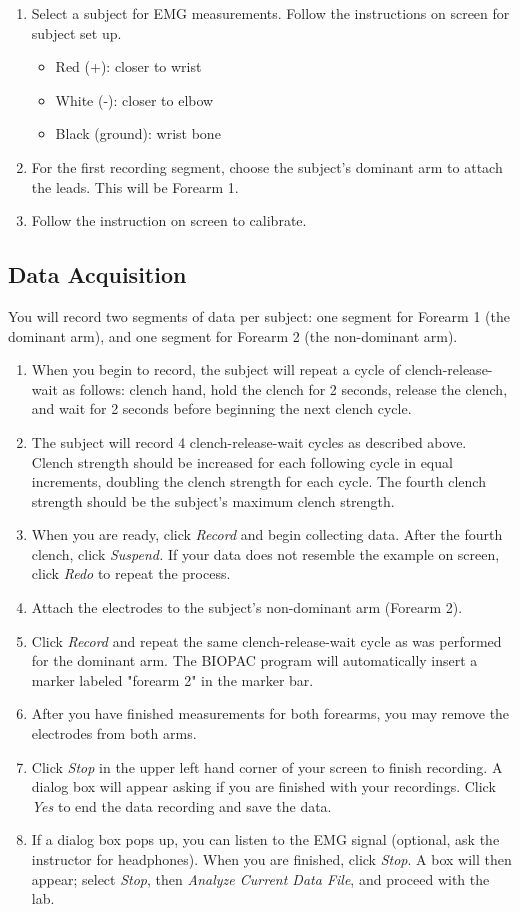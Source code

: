 \documentclass{article}
\begin{document}
\begin{enumerate}
	\item Select a subject for EMG measurements. Follow the instructions on screen for subject set up.
		\begin{itemize}
			\item Red (+): closer to wrist
			\item White (-): closer to elbow
			\item Black (ground): wrist bone
		\end{itemize}
	\item For the first recording segment, choose the subject's dominant arm to attach the leads. This will be Forearm 1.
	\item Follow the instruction on screen to calibrate.
\end{enumerate}

\subsection*{Data Acquisition}
You will record two segments of data per subject: one segment for Forearm 1 (the dominant arm), and one segment for Forearm 2 (the non-dominant arm).
\begin{enumerate}
	\item When you begin to record, the subject will repeat a cycle of clench-release-wait as follows: clench hand, hold the clench for 2 seconds, release the clench, and wait for 2 seconds before beginning the next clench cycle.
	\item The subject will record 4 clench-release-wait cycles as described above. Clench strength should be increased for each following cycle in equal increments, doubling the clench strength for each cycle. The fourth clench strength should be the subject's maximum clench strength.
	\item When you are ready, click \textit{Record} and begin collecting data. After the fourth clench, click \textit{Suspend.} If your data does not resemble the example on screen, click \textit{Redo} to repeat the process.
	\item Attach the electrodes to the subject's non-dominant arm (Forearm 2).
	\item Click \textit{Record} and repeat the same clench-release-wait cycle as was performed for the dominant arm. The BIOPAC program will automatically insert a marker labeled "forearm 2" in the marker bar.
	\item After you have finished measurements for both forearms, you may remove the electrodes from both arms.
	\item Click \textit{Stop} in the upper left hand corner of your screen to finish recording. A dialog box will appear asking if you are finished with your recordings. Click \textit{Yes} to end the data recording and save the data.
	\item If a dialog box pops up, you can listen to the EMG signal (optional, ask the instructor for headphones). When you are finished, click \textit{Stop}. A box will then appear; select \textit{Stop}, then \textit{Analyze Current Data File}, and proceed with the lab.
\end{enumerate}
\end{document}
